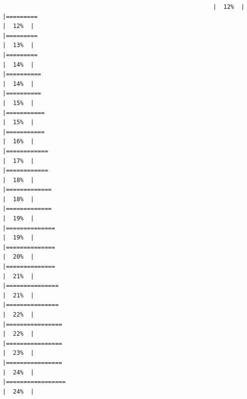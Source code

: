 \documentclass[
]{article}
\begin{document}
\begin{verbatim}
                                                            |  12%  |                                                                              |=========                                                             |  12%  |                                                                              |=========                                                             |  13%  |                                                                              |=========                                                             |  14%  |                                                                              |==========                                                            |  14%  |                                                                              |==========                                                            |  15%  |                                                                              |===========                                                           |  15%  |                                                                              |===========                                                           |  16%  |                                                                              |============                                                          |  17%  |                                                                              |============                                                          |  18%  |                                                                              |=============                                                         |  18%  |                                                                              |=============                                                         |  19%  |                                                                              |==============                                                        |  19%  |                                                                              |==============                                                        |  20%  |                                                                              |==============                                                        |  21%  |                                                                              |===============                                                       |  21%  |                                                                              |===============                                                       |  22%  |                                                                              |================                                                      |  22%  |                                                                              |================                                                      |  23%  |                                                                              |================                                                      |  24%  |                                                                              |=================                                                     |  24%  |                                                                              
\end{verbatim}
\end{document}
